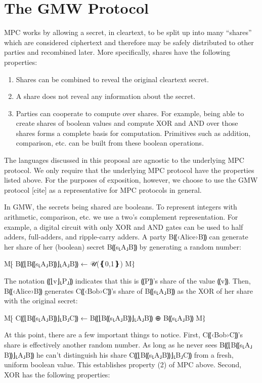 \documentclass{report}
\newcommand{\alice}{B⸨‹Alice›B⸩\xspace}
\newcommand{\bob}{C⸨‹Bob›C⸩\xspace}
\newcommand{\alices}[1]{B⸨#1⸤A⸥B⸩}
\newcommand{\bobs}[1]{C⸨#1⸤B⸥C⸩}
\newcommand{\aliceSec}{\alices{s}\xspace}
\newcommand{\aliceSh}[1]{\alices{⌊#1⌋}}
\newcommand{\bobSh}[1]{\bobs{⌊#1⌋}}
\begin{document}
\chapter{The GMW Protocol}
\label{ch:gmw}

MPC works by allowing a secret, in cleartext, to be split up into many ``shares'' which are considered ciphertext
and therefore may be safely distributed to other parties and recombined later. More specifically, shares have the following properties:
\begin{enumerate}
\item Shares can be combined to reveal the original cleartext secret.
\item A share does not reveal any information about the secret.
\item Parties can cooperate to compute over shares. For example, being able to create shares of boolean values
  and compute XOR and AND over those shares forms a complete basis for computation. Primitives such as addition,
  comparison, etc. can be built from these boolean operations.
\end{enumerate}

The languages discussed in this proposal are agnostic to the underlying MPC protocol. We only require that the underlying MPC protocol
have the properties listed above. For the purposes of exposition, however, we choose to use the GMW protocol [cite] as a
representative for MPC protocols in general.

In GMW, the secrets being shared are booleans. To represent integers with arithmetic, comparison, etc. we use a two's
complement representation. For example, a digital circuit with only XOR and AND gates can be used to half adders,
full-adders, and ripple-carry adders. A party \alice can generate her share of her (boolean) secret \aliceSec by
generating a random number:

M⁅
\aliceSh{\aliceSec} ← 𝒰(❴0,1❵)
M⁆

The notation ⸨⌊v⌋⸤P⸥⸩ indicates that this is ⸨P⸩'s share of the value ⸨v⸩. Then, \alice generates \bob's share of \aliceSec
as the XOR of her share with the original secret:

M⁅
\bobSh{\aliceSec} ← \aliceSh{\aliceSec} ⊕ \aliceSec
M⁆

At this point, there are a few important things to notice. First, \bob's share is effectively another random number.
As long as he never sees \aliceSh{\aliceSec} he can't distinguish his share \bobSh{\aliceSec} from a fresh, uniform
boolean value. This establishes property (2) of MPC above. Second, XOR has the following properties:
\end{document}

